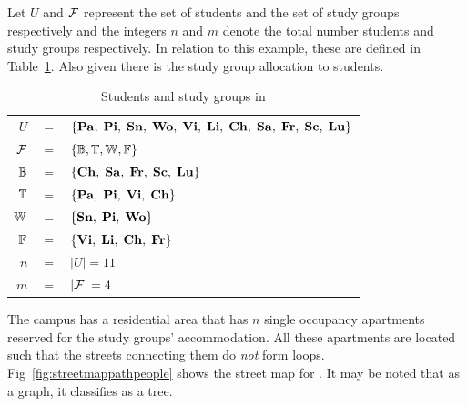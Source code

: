 \documentclass[MS]             %
              {iitmdiss_as}    %
\begin{document}
Let $U$ and ${\cal F}$ represent the set of students and the set of study
groups respectively and the integers $n$ and $m$ denote the total
number students and study groups respectively. In relation to this
example, these are defined in Table~\ref{tab:wsigroups}. Also given
there is the study group allocation to students.
 
\begin{table}[htbp]
  \centering
  { \footnotesize
  \begin{tabular}{rcl}
    $U $&$=$&$ \{{\bf Pa},\; {\bf Pi},\; {\bf Sn},\; {\bf Wo},\; {\bf Vi},\; {\bf Li},\; {\bf Ch},\;
    {\bf Sa},\; {\bf Fr},\; {\bf Sc},\; {\bf Lu}\}$\\
    ${\cal F} $&$=$&$ \{\mathbb{B}, \mathbb{T}, \mathbb{W}, \mathbb{F}\}$\\
    $\mathbb{B} $&$=$&$ \{{\bf Ch},\;  {\bf Sa},\;  {\bf Fr},\;  {\bf Sc},\;  {\bf Lu} \}$\\
    $\mathbb{T} $&$=$&$ \{{\bf Pa},\;  {\bf Pi},\;  {\bf Vi},\;  {\bf Ch} \}$\\
    $\mathbb{W} $&$=$&$ \{{\bf Sn},\;  {\bf Pi},\;  {\bf Wo} \}$\\
    $\mathbb{F} $&$=$&$ \{{\bf Vi},\;  {\bf Li},\;  {\bf Ch},\;  {\bf Fr} \}$\\
    $n $&$=$&$ |U| = 11$\\
    $m $&$=$&$ |{\cal F}| = 4$      
  \end{tabular}
}
  \caption{\figtabsize Students and study groups in \WSI}
  \label{tab:wsigroups}
\end{table}

The campus has a residential area {\residenceblock} that has $n$
single occupancy apartments reserved for the study groups'
accommodation.  All these apartments are located such that the streets
connecting them do {\em not} form
loops. Fig~\ref{fig:streetmappathpeople} 
shows the street map for {\residenceblock}. It may be noted that as a
graph, it classifies as a tree.
\end{document}

